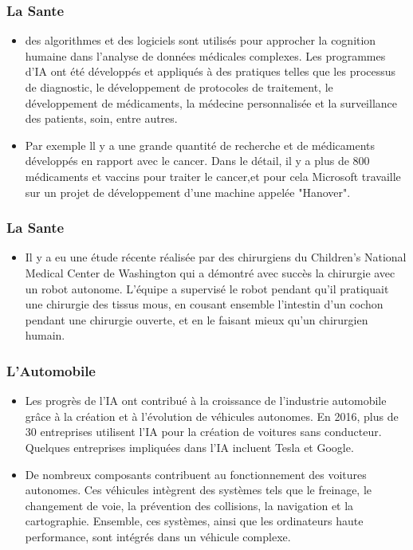 \documentclass{beamer}
\begin{document}
 	
 	\begin{frame}
 	   \frametitle{La Sante}
 	   \begin{itemize}
 	       \item des algorithmes et des logiciels sont utilisés pour approcher la cognition humaine dans l'analyse de données médicales complexes. Les programmes d'IA ont été développés et appliqués à des pratiques telles que les processus de diagnostic, le développement de protocoles de traitement, le développement de médicaments, la médecine personnalisée et la surveillance des patients, soin, entre autres.
 	       
 	       \item Par exemple ll y a une grande quantité de recherche et de médicaments développés en rapport avec le cancer. Dans le détail, il y a plus de 800 médicaments et vaccins pour traiter le cancer,et pour cela  Microsoft travaille sur un projet de développement d'une machine appelée "Hanover".
 	       
 	   \end{itemize}
 	\end{frame}
 	
 	
 		\begin{frame}
 	   \frametitle{La Sante}
 	   \begin{itemize}
 	   \item Il y a eu une étude récente réalisée par des chirurgiens du Children's National Medical Center de Washington qui a démontré avec succès la chirurgie avec un robot autonome. L'équipe a supervisé le robot pendant qu'il pratiquait une chirurgie des tissus mous, en cousant ensemble l'intestin d'un cochon pendant une chirurgie ouverte, et en le faisant mieux qu'un chirurgien humain.
 	   \end{itemize}
 	 \end{frame}
 	
 	
 	\begin{frame}
 	   \frametitle{L'Automobile}
 	   \begin{itemize}
 	       \item Les progrès de l'IA ont contribué à la croissance de l'industrie automobile grâce à la création et à l'évolution de véhicules autonomes. En 2016, plus de 30 entreprises utilisent l'IA pour la création de voitures sans conducteur. Quelques entreprises impliquées dans l'IA incluent Tesla et Google.
 	       
 	       \item De nombreux composants contribuent au fonctionnement des voitures autonomes. Ces véhicules intègrent des systèmes tels que le freinage, le changement de voie, la prévention des collisions, la navigation et la cartographie. Ensemble, ces systèmes, ainsi que les ordinateurs haute performance, sont intégrés dans un véhicule complexe.
 	   \end{itemize}
 	\end{frame}
 	
\end{document}
